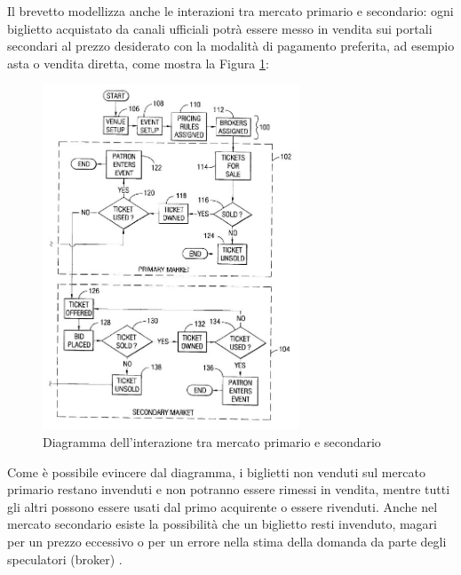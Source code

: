 Il brevetto modellizza anche le interazioni tra mercato primario e secondario: ogni biglietto acquistato da canali ufficiali potrà essere messo in vendita sui portali secondari al prezzo desiderato con la modalità di pagamento preferita, ad esempio asta o vendita diretta, come mostra la Figura \ref{mercati}:
\begin{figure}[htbp]
	\centering
	\includegraphics[width=0.68\textwidth]{chapter2/immagini/brevetto1}
	\caption{Diagramma dell'interazione tra mercato primario e secondario}
	\label{mercati}
\end{figure}
Come è possibile evincere dal diagramma, i biglietti non venduti sul mercato primario restano invenduti e non potranno essere rimessi in vendita, mentre tutti gli altri possono essere usati dal primo acquirente o essere rivenduti. Anche nel mercato secondario esiste la possibilità che un biglietto resti invenduto, magari per un prezzo eccessivo o per un errore nella stima della domanda da parte degli speculatori (broker) \cite{connolly2006rockonomics}.
